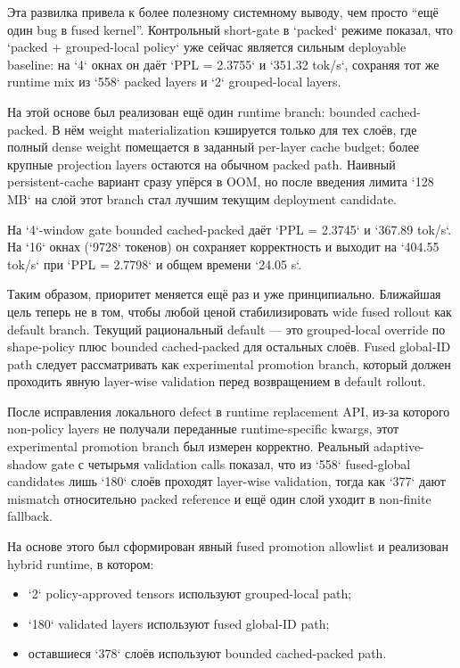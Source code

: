 Эта развилка привела к более полезному системному выводу, чем просто ``ещё один
bug в fused kernel''. Контрольный short-gate в `packed` режиме показал, что
`packed + grouped-local policy` уже сейчас является сильным deployable baseline:
на `4` окнах он даёт `PPL = 2.3755` и `351.32 tok/s`, сохраняя тот же runtime
mix из `558` packed layers и `2` grouped-local layers.

На этой основе был реализован ещё один runtime branch: bounded cached-packed.
В нём weight materialization кэшируется только для тех слоёв, где полный dense
weight помещается в заданный per-layer cache budget; более крупные projection
layers остаются на обычном packed path. Наивный persistent-cache вариант сразу
упёрся в OOM, но после введения лимита `128 MB` на слой этот branch стал лучшим
текущим deployment candidate.

На `4`-window gate bounded cached-packed даёт `PPL = 2.3745` и `367.89 tok/s`.
На `16` окнах (`9728` токенов) он сохраняет корректность и выходит на
`404.55 tok/s` при `PPL = 2.7798` и общем времени `24.05 s`.

Таким образом, приоритет меняется ещё раз и уже принципиально. Ближайшая цель
теперь не в том, чтобы любой ценой стабилизировать wide fused rollout как
default branch. Текущий рациональный default — это grouped-local override по
shape-policy плюс bounded cached-packed для остальных слоёв. Fused global-ID
path следует рассматривать как experimental promotion branch, который должен
проходить явную layer-wise validation перед возвращением в default rollout.

После исправления локального defect в runtime replacement API, из-за которого
non-policy layers не получали переданные runtime-specific kwargs, этот
experimental promotion branch был измерен корректно. Реальный adaptive-shadow
gate с четырьмя validation calls показал, что из `558` fused-global candidates
лишь `180` слоёв проходят layer-wise validation, тогда как `377` дают mismatch
относительно packed reference и ещё один слой уходит в non-finite fallback.

На основе этого был сформирован явный fused promotion allowlist и реализован
hybrid runtime, в котором:

\begin{itemize}[leftmargin=1.5em]
\item `2` policy-approved tensors используют grouped-local path;
\item `180` validated layers используют fused global-ID path;
\item оставшиеся `378` слоёв используют bounded cached-packed path.
\end{itemize}

